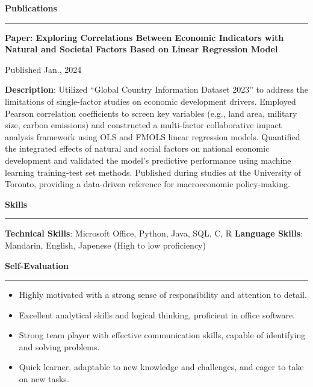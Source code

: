 \documentclass[
  16,
]{article}
\providecommand{\tightlist}{%
  \setlength{\itemsep}{0pt}\setlength{\parskip}{0pt}}\usepackage{longtable,booktabs,array}
\begin{document}
\vspace{7pt}

\begin{large}{\bf Publications}
  \vspace{3pt}
  \hrule
  \begin{multicols}{2}
  \parbox{1.6\linewidth}{\bf Paper: Exploring Correlations Between Economic Indicators with Natural and Societal Factors Based on Linear Regression Model}
    \begin{flushright}Published Jan., 2024\end{flushright}
  \end{multicols}
\end{large}
\vspace{-0.16cm}

\textbf{Description}: Utilized ``Global Country Information Dataset
2023'' to address the limitations of single-factor studies on economic
development drivers. Employed Pearson correlation coefficients to screen
key variables (e.g., land area, military size, carbon emissions) and
constructed a multi-factor collaborative impact analysis framework using
OLS and FMOLS linear regression models. Quantified the integrated
effects of natural and social factors on national economic development
and validated the model's predictive performance using machine learning
training-test set methods. Published during studies at the University of
Toronto, providing a data-driven reference for macroeconomic
policy-making.

\vspace{7pt}

\begin{large}{\bf Skills}
  \vspace{3pt}
  \hrule
\end{large}

\textbf{Technical Skills}: Microsoft Office, Python, Java, SQL, C, R
\textbf{Language Skills}: Mandarin, English, Japenese (High to low
proficiency)

\begin{large}{\bf Self-Evaluation}
  \vspace{3pt}
  \hrule
\end{large}

\begin{itemize}
\tightlist
\item
  Highly motivated with a strong sense of responsibility and attention
  to detail.
\item
  Excellent analytical skills and logical thinking, proficient in office
  software.
\item
  Strong team player with effective communication skills, capable of
  identifying and solving problems.
\item
  Quick learner, adaptable to new knowledge and challenges, and eager to
  take on new tasks.
\end{itemize}
\end{document}
